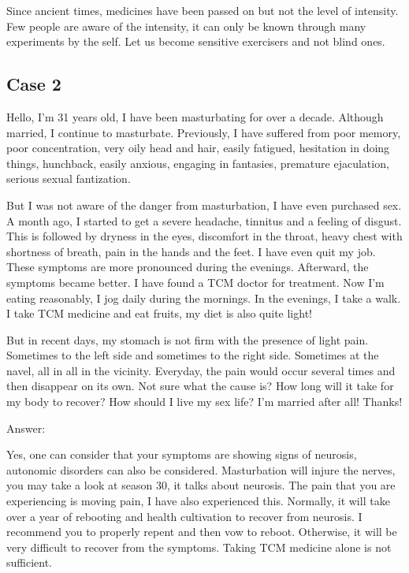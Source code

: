 \documentclass[
]{book}
\begin{document}
Since ancient times, medicines have been passed on but not the level of intensity. Few people are aware of the intensity, it can only be known through many experiments by the self. Let us become sensitive exercisers and not blind ones.

\hypertarget{case-2-1}{%
\subsection{Case 2}\label{case-2-1}}

Hello, I'm 31 years old, I have been masturbating for over a decade. Although married, I continue to masturbate. Previously, I have suffered from poor memory, poor concentration, very oily head and hair, easily fatigued, hesitation in doing things, hunchback, easily anxious, engaging in fantasies, premature ejaculation, serious sexual fantization.

But I was not aware of the danger from masturbation, I have even purchased sex. A month ago, I started to get a severe headache, tinnitus and a feeling of disgust. This is followed by dryness in the eyes, discomfort in the throat, heavy chest with shortness of breath, pain in the hands and the feet. I have even quit my job. These symptoms are more pronounced during the evenings. Afterward, the symptoms became better. I have found a TCM doctor for treatment. Now I'm eating reasonably, I jog daily during the mornings. In the evenings, I take a walk. I take TCM medicine and eat fruits, my diet is also quite light!

But in recent days, my stomach is not firm with the presence of light pain. Sometimes to the left side and sometimes to the right side. Sometimes at the navel, all in all in the vicinity. Everyday, the pain would occur several times and then disappear on its own. Not sure what the cause is? How long will it take for my body to recover? How should I live my sex life? I'm married after all! Thanks!

Answer:

Yes, one can consider that your symptoms are showing signs of neurosis, autonomic disorders can also be considered. Masturbation will injure the nerves, you may take a look at season 30, it talks about neurosis. The pain that you are experiencing is moving pain, I have also experienced this. Normally, it will take over a year of rebooting and health cultivation to recover from neurosis. I recommend you to properly repent and then vow to reboot. Otherwise, it will be very difficult to recover from the symptoms. Taking TCM medicine alone is not sufficient.
\end{document}
